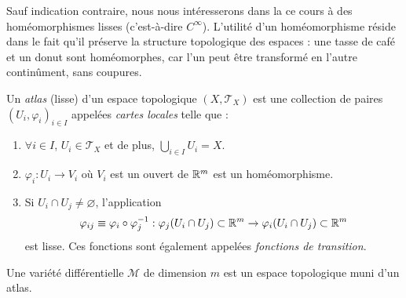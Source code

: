 Sauf indication contraire, nous nous intéresserons dans la ce cours à des homéomorphismes lisses (c'est-à-dire $C^\infty$). L'utilité d'un homéomorphisme réside dans le fait qu'il préserve la structure topologique des espaces : une tasse de café et un donut sont homéomorphes, car l'un peut être transformé en l'autre continûment, sans coupures. 
\begin{theoremframe}
    \begin{defi}
        Un \textit{atlas} (lisse) d'un espace topologique $(X,\mathcal{T}_X)$ est une collection de paires $(U_i,\varphi_i)_{i\in I}$ appelées \emph{cartes locales} telle que :
        \begin{enumerate}[label=\roman*.]
            \item $\forall i\in I$, $U_i \in \mathcal{T}_X$ et de plus, $\bigcup_{i\in I} U_i = X$.
            \item $\varphi_i:U_i\to V_i$ où $V_i$ est un ouvert de $\mathbb{R}^m$ est un homéomorphisme.
            \item Si $U_i \cap U_j \neq \varnothing$, l'application 
            \begin{align}
                \varphi_{ij} \equiv \varphi_i \circ \varphi^{-1}_j:\varphi_j(U_i\cap U_j) \subset \mathbb{R}^m \to \varphi_i(U_i\cap U_j) \subset \mathbb{R}^m 
            \end{align}
            est lisse. Ces fonctions sont également appelées \emph{fonctions de transition}.
        \end{enumerate}
    \end{defi}
\end{theoremframe}
\begin{theoremframe}
    \begin{defi}
        Une variété différentielle $\mathcal{M}$ de dimension $m$ est un espace topologique muni d'un atlas.
    \end{defi}
\end{theoremframe}
